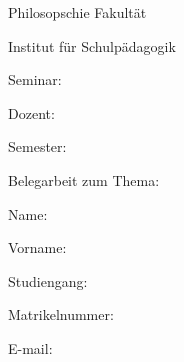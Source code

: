 \documentclass{article}
\begin{document}
\flushleft
\thispagestyle{empty}
\setlength{\parindent}{0pt}
\Large
Philosopschie Fakult\"at\par
Institut f\"ur Schulp\"adagogik\par
Seminar:\par
Dozent:\par
Semester:\par
\vfill
\begin{center}
	Belegarbeit zum Thema:\par
\end{center}
\vfill
\vfill
Name:\par
Vorname:\par
Studiengang:\par
Matrikelnummer:\par
E-mail:\par
\end{document}
